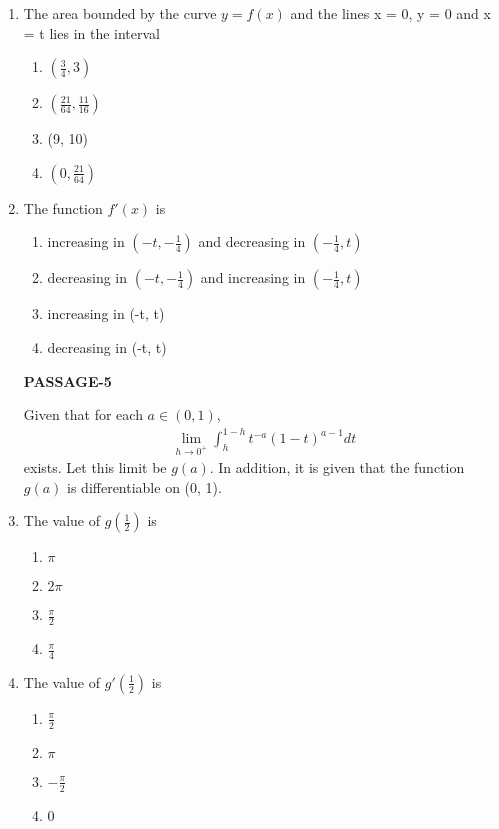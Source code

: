 \begin{enumerate}[label=\arabic*.,ref=\thesubsection.\theenumi]
\item The area bounded by the curve $y = f(x)$ and the lines x = 0, y = 0 and x = t lies in the interval
\begin{enumerate}
\item $\left(\frac{3}{4}, 3\right)$
\item $\left(\frac{21}{64}, \frac{11}{16}\right)$
\item (9, 10)
\item $\left(0, \frac{21}{64}\right)$
\end{enumerate}

\item The function $f'(x)$ is
\begin{enumerate}
\item increasing in $\left(-t, -\frac{1}{4}\right)$ and decreasing in $\left(-\frac{1}{4}, t\right)$
\item decreasing in $\left(-t, -\frac{1}{4}\right)$ and increasing in $\left(-\frac{1}{4}, t\right)$
\item increasing in (-t, t)
\item decreasing in (-t, t)
\end{enumerate}

\textbf{PASSAGE-5}

Given that for each $a \in (0, 1)$,
\begin{align*}
\lim_{h \to 0^{+}}\int_{h}^{1 - h}t^{-a}(1 - t)^{a - 1}dt
\end{align*}
exists. Let this limit be $g(a)$. In addition, it is given that the function $g(a)$ is differentiable on (0, 1).

\item The value of $g\left(\frac{1}{2}\right)$ is
\begin{enumerate}
\item $\pi$
\item $2\pi$
\item $\frac{\pi}{2}$
\item $\frac{\pi}{4}$
\end{enumerate}

\item The value of $g'\left(\frac{1}{2}\right)$ is
\begin{enumerate}
\item $\frac{\pi}{2}$
\item $\pi$
\item $-\frac{\pi}{2}$
\item 0
\end{enumerate}


\end{enumerate}
